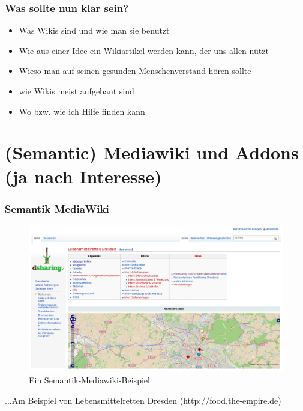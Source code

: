 \documentclass{beamer}              %
\begin{document}
  
\begin{frame}
  \frametitle{Was sollte nun klar sein?}
  \begin{itemize}[<+->]
    \item Was Wikis sind und wie man sie benutzt
    \item Wie aus einer Idee ein Wikiartikel werden kann, der uns allen nützt
    \item Wieso man auf seinen gesunden Menschenverstand hören sollte
    \item wie Wikis meist aufgebaut sind
    \item Wo bzw. wie ich Hilfe finden kann
  \end{itemize}
\end{frame}

\section{(Semantic) Mediawiki und Addons (ja nach Interesse)}

\begin{frame}
  \frametitle{Semantik MediaWiki}

	\begin{figure}[tbph]
		\centering
		\includegraphics[width=\linewidth]{Lebensmittelretten-Dresden_Landkarte_mit_Seitenleisten}
		\caption[Ein Semantik-Mediawiki-Beispiel]{Ein Semantik-Mediawiki-Beispiel}
		\label{fig:Lebensmittelretten-Dresden_Landkarte_mit_Seitenleisten}
	\end{figure}

  ...Am Beispiel von Lebensmittelretten Dresden (http://food.the-empire.de)
\end{frame}
  
%
%
\end{document}
